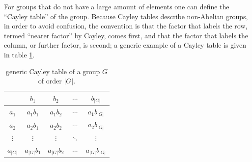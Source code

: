 For groups that do not have a large amount of elements one can define the ``Cayley table'' of the group. Because Cayley tables describe non-Abelian groups, in order to avoid confusion, the convention is that the factor that labels the row, termed ``nearer factor'' by Cayley, comes first, and that the factor that labels the column, or further factor, is second; a generic example of a Cayley table is given in table \ref{tab: generic Cayley table}.
\begin{table}[h]
    \centering
    \begin{tabular}{|c|cccc|}
        \hline
        & $b_1$ & $b_2$ & $\cdots$ & $b_{|G|}$ \\ \hline
        $a_1$ & $a_1b_1$ & $a_1b_2$ & $\cdots$ & $a_1b_{|G|}$ \\
        $a_2$ & $a_2b_1$ & $a_2b_2$ & $\cdots$ & $a_2b_{|G|}$ \\
        $\vdots$ & $\vdots$ & $\vdots$ & $\ddots$ & $\vdots$ \\
        $a_{|G|}$ & $a_{|G|}b_1$ & $a_{|G|}b_2$ & $\cdots$ & $a_{|G|}b_{|G|}$ \\ \hline
    \end{tabular}
    \caption{generic Cayley table of a group $G$ of order $|G|$.}
    \label{tab: generic Cayley table}
\end{table}

